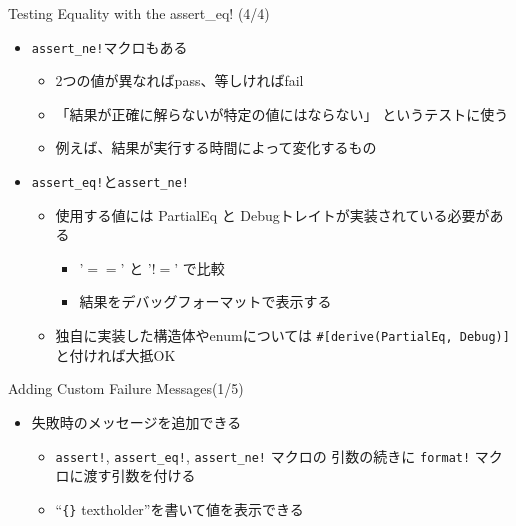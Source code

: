 \documentclass[cjk,14pt,xcolor=dvipsnames,table,dvipdfmx,professional font,t,fragile]{beamer}
\begin{document}
\begin{frame}[fragile]{Testing Equality with the assert\_eq! (4/4)}
 \begin{itemize}
  \item \verb|assert_ne!|マクロもある
	\begin{itemize}
	 \item $2$つの値が異なればpass、等しければfail
	 \item 「結果が正確に解らないが特定の値にはならない」
	       というテストに使う
	 \item 例えば、結果が実行する時間によって変化するもの
	\end{itemize}
  \item \verb|assert_eq!|と\verb|assert_ne!|
	\begin{itemize}
	 \item 使用する値には PartialEq と Debugトレイトが実装されている必要がある
	       \begin{itemize}
		\item '$==$' と '$!=$' で比較
		\item 結果をデバッグフォーマットで表示する
	       \end{itemize}
	 \item 独自に実装した構造体やenumについては
	       \verb|#[derive(PartialEq, Debug)]| と付ければ大抵OK
	\end{itemize}
 \end{itemize}
\end{frame}

\begin{frame}[fragile]{Adding Custom Failure Messages(1/5)}
 \begin{itemize}
  \item 失敗時のメッセージを追加できる
	\begin{itemize}
	 \item \verb|assert!|, \verb|assert_eq!|, \verb|assert_ne!| マクロの
	       引数の続きに \verb|format!| マクロに渡す引数を付ける
	 \item ``\verb|{}| textholder''を書いて値を表示できる
	\end{itemize}
 \end{itemize}
\end{frame}
\end{document}
